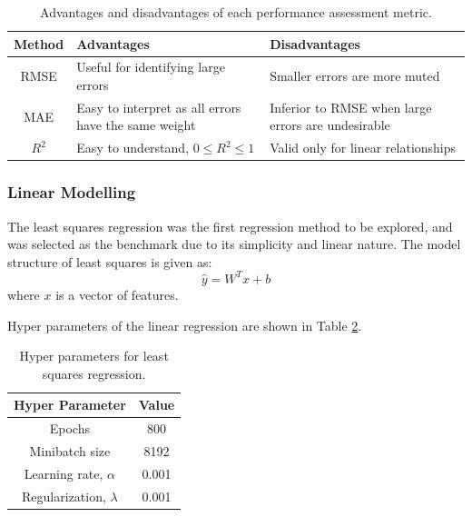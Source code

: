 \begin{table}[h]
    \centering
    {
    \begin{tabular}{ c | p{7cm} | p{7cm}}
         Method             & Advantages        &  Disadvantages \\
        \hline
        RMSE                &  Useful for identifying large errors                            &  Smaller errors are more muted        \\
        
        MAE                 &  Easy to interpret as all errors have the same weight           &  Inferior to RMSE when large errors are undesirable \\
        
        $R^2$               &  Easy to understand, $0 \leq R^2 \leq 1$                                         &  Valid only for linear relationships       \\             
    \end{tabular}}
    \caption{Advantages and disadvantages of each performance assessment metric.}
    \label{tab:08performanceassessment}
\end{table}

\subsubsection{Linear Modelling}
The least squares regression was the first regression method to be explored, and was selected as the benchmark due to its simplicity and linear nature. The model structure of least squares is given as:
\begin{equation}
    \hat{y} = W^Tx + b
    \label{eq:08LS}
\end{equation}
where $x$ is a vector of features. 

Hyper parameters of the linear regression are shown in Table \ref{tab:08LSHparameters}.

\begin{table}[h]
    \centering
    {
    \begin{tabular}{ c | c}
        Hyper Parameter                  &  Value       \\
        \hline
        Epochs                           &  800      \\
        Minibatch size                   &  8192     \\
        Learning rate, $\alpha$          &  0.001    \\
        Regularization, $\lambda$          &  0.001  \\
    \end{tabular}}
    \caption{Hyper parameters for least squares regression.}
    \label{tab:08LSHparameters}
\end{table}


